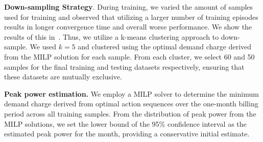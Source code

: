 {{{\bf Down-sampling Strategy}.
During training, we varied the amount of samples used for training and observed that utilizing a larger number of training episodes results in longer convergence time and overall worse performance. We show the results of this in~.
Thus, we utilize a k-means clustering approach to down-sample. We used $k=5$ and clustered using the optimal demand charge derived from the MILP solution for each sample. 
From each cluster, we select 60 and 50 samples for the final training and testing datasets respectively, ensuring that these datasets are mutually exclusive. 
}

\textbf{Peak power estimation.} 
We employ a MILP solver to determine the minimum demand charge derived from optimal action sequences over the one-month billing period across all training samples. From the distribution of peak power from the MILP solutions, we set the lower bound of the 95\% confidence interval as the estimated peak power for the month, providing a conservative initial estimate.




}
